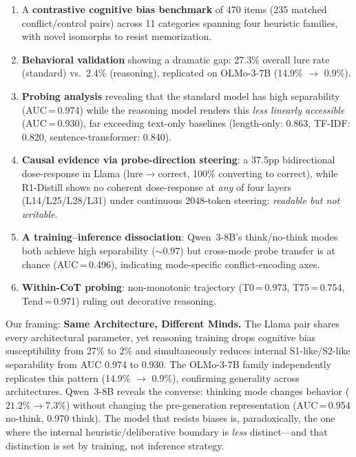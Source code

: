 \documentclass[twocolumn,10pt]{article}
\newcommand{\sone}{S1-like}
\newcommand{\stwo}{S2-like}
\begin{document}
\begin{enumerate}[leftmargin=*,itemsep=2pt]
  \item A \textbf{contrastive cognitive bias benchmark} of 470 items
  (235 matched conflict/control pairs) across 11 categories spanning
  four heuristic families, with novel isomorphs to resist memorization.

  \item \textbf{Behavioral validation} showing a dramatic gap: 27.3\%
  overall lure rate (standard) vs.\ 2.4\% (reasoning), replicated on
  OLMo-3-7B (14.9\% $\to$ 0.9\%).

  \item \textbf{Probing analysis} revealing that the standard model has
  high separability (AUC\,=\,0.974) while the reasoning model renders
  this \emph{less linearly accessible} (AUC\,=\,0.930),
  far exceeding text-only baselines (length-only: 0.863, TF-IDF: 0.820, sentence-transformer: 0.840).

  \item \textbf{Causal evidence via probe-direction steering}: a
  37.5pp bidirectional dose-response in Llama (lure$\to$correct,
  100\% converting to correct), while R1-Distill shows no coherent dose-response at
  \emph{any} of four layers (L14/L25/L28/L31) under continuous
  2048-token steering: \emph{readable but not writable}.

  \item \textbf{A training--inference dissociation}: Qwen~3-8B's
  think/no-think modes both achieve high separability (${\sim}$0.97)
  but cross-mode probe transfer is at chance (AUC\,=\,0.496),
  indicating mode-specific conflict-encoding axes.

  \item \textbf{Within-CoT probing}: non-monotonic trajectory
  (T0\,=\,0.973, T75\,=\,0.754, Tend\,=\,0.971) ruling out
  decorative reasoning.
\end{enumerate}

\noindent Our framing: \textbf{Same Architecture, Different Minds.}
The Llama pair shares every architectural parameter, yet reasoning
training drops cognitive bias susceptibility from 27\% to 2\% and
simultaneously reduces internal \sone{}/\stwo{} separability from
AUC 0.974 to 0.930.  The OLMo-3-7B family
independently replicates this pattern (14.9\% $\to$ 0.9\%), confirming
generality across architectures.  Qwen~3-8B reveals the converse: thinking mode
changes behavior ($21.2\% \to 7.3\%$) without changing the pre-generation
representation (AUC\,=\,0.954 no-think, 0.970 think).  The model that resists
biases is, paradoxically, the one where the internal
heuristic/deliberative boundary is \emph{less} distinct---and that
distinction is set by training, not inference strategy.
\end{document}
